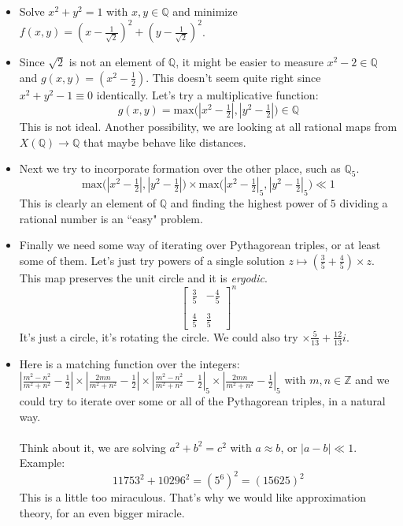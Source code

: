 \documentclass[12pt]{article}
\begin{document}
\begin{itemize}
\item Solve $x^2 + y^2 = 1$ with $x,y \in \mathbb{Q}$ and minimize $f(x,y) =  (x - \frac{1}{\sqrt{2}})^2 + (y - \frac{1}{\sqrt{2}})^2  $. 
\item Since $\sqrt{2}$ is not an element of $\mathbb{Q}$, it might be easier to measure $x^2 - 2 \in \mathbb{Q}$ and $g(x,y) = (x^2 - \frac{1}{2})$. This doesn't seem quite right since $x^2 + y^2 - 1 \equiv 0$ identically. Let's try a multiplicative function:
$$ g(x,y) = \text{max} \big( |x^2 - \tfrac{1}{2}| , |y^2 - \tfrac{1}{2}| \big) \in \mathbb{Q} $$
This is not ideal.  Another possibility, we are looking at all rational maps from $X(\mathbb{Q}) \to \mathbb{Q}$ that maybe behave like distances. 
\item Next we try to incorporate formation over the other place, such as $\mathbb{Q}_5$.
$$ \text{max} \big( |x^2 - \tfrac{1}{2}| , |y^2 - \tfrac{1}{2}| \big) \times \text{max} \big( |x^2 - \tfrac{1}{2}|_5 , |y^2 - \tfrac{1}{2}|_5 \big)  \ll 1 $$
This is clearly an element of $\mathbb{Q}$ and finding the highest power of $5$ dividing a rational number is an ``easy" problem.
\item Finally we need some way of iterating over Pythagorean triples, or at least some of them.  Let's just try powers of a single solution $z \mapsto (\frac{3}{5} + \frac{4}{5} ) \times z$.  This map preserves the unit circle and it is \textit{ergodic}.
$$ \left[ \begin{array}{cr} \frac{3}{5} & -\frac{4}{5} \\ \\
\frac{4}{5} & \frac{3}{5}\end{array} \right]^n $$   
It's just a circle, it's rotating the circle.  We could also try $ \times \frac{5}{13} +  \frac{12}{13}i$.
\item Here is a matching function over the integers: $ |\frac{m^2 - n^2}{m^2 + n^2} - \frac{1}{2}| \times |\frac{2mn}{m^2 + n^2} - \frac{1}{2}| \times 
|\frac{m^2 - n^2}{m^2 + n^2} - \frac{1}{2}|_5 \times |\frac{2mn}{m^2 + n^2} - \frac{1}{2}|_5$ with $m, n \in \mathbb{Z}$ and we could try to iterate over some or all of the Pythagorean triples, in a natural way. \\ \\
Think about it, we are solving $a^2 + b^2 = c^2$ with $a \approx b$, or $|a - b| \ll 1$.  Example:
$$ 11753^2 + 10296^2 = (5^6)^2 = (15625)^2 $$
This is a little too miraculous.  That's why we would like approximation theory, for an even bigger miracle.
\end{itemize}
\end{document}
